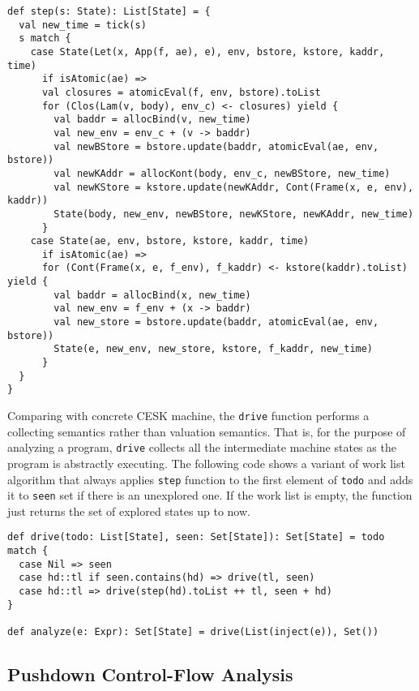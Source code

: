 \documentclass[acmsmall,review,anonymous]{acmart}\settopmatter{printfolios=true,printccs=false,printacmref=false}
\begin{document}
\begin{verbatim}
def step(s: State): List[State] = {
  val new_time = tick(s)
  s match {
    case State(Let(x, App(f, ae), e), env, bstore, kstore, kaddr, time) 
      if isAtomic(ae) =>
      val closures = atomicEval(f, env, bstore).toList
      for (Clos(Lam(v, body), env_c) <- closures) yield {
        val baddr = allocBind(v, new_time)
        val new_env = env_c + (v -> baddr)
        val newBStore = bstore.update(baddr, atomicEval(ae, env, bstore))
        val newKAddr = allocKont(body, env_c, newBStore, new_time)
        val newKStore = kstore.update(newKAddr, Cont(Frame(x, e, env), kaddr))
        State(body, new_env, newBStore, newKStore, newKAddr, new_time)
      }
    case State(ae, env, bstore, kstore, kaddr, time) 
      if isAtomic(ae) =>
      for (Cont(Frame(x, e, f_env), f_kaddr) <- kstore(kaddr).toList) yield {
        val baddr = allocBind(x, new_time)
        val new_env = f_env + (x -> baddr)
        val new_store = bstore.update(baddr, atomicEval(ae, env, bstore))
        State(e, new_env, new_store, kstore, f_kaddr, new_time)
      }
  }
}
\end{verbatim}

Comparing with concrete CESK machine, the
\texttt{drive} function performs a collecting semantics rather than valuation
semantics. That is, for the purpose of analyzing a program, \texttt{drive}
collects all the intermediate machine states as the program is abstractly executing.
The following code shows a variant of work list algorithm that always applies \texttt{step}
function to the first element of \texttt{todo} and adds it to \texttt{seen} set
if there is an unexplored one. If the work list is empty, the function just
returns the set of explored states up to now.

\begin{verbatim}
def drive(todo: List[State], seen: Set[State]): Set[State] = todo match {
  case Nil => seen
  case hd::tl if seen.contains(hd) => drive(tl, seen)
  case hd::tl => drive(step(hd).toList ++ tl, seen + hd)
}

def analyze(e: Expr): Set[State] = drive(List(inject(e)), Set())
\end{verbatim}


\subsection{Pushdown Control-Flow Analysis}
\end{document}

